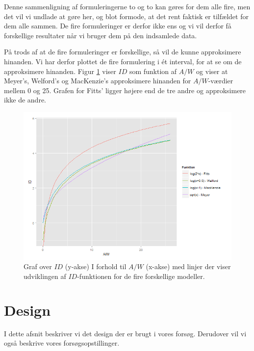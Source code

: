Denne sammenligning af formuleringerne to og to kan gøres for dem alle fire, men det vil vi undlade at gøre her, og blot formode, at det rent faktisk er tilfældet for dem alle sammen. De fire formuleringer er derfor ikke ens og vi vil derfor få forskellige resultater når vi bruger dem på den indsamlede data.

På trods af at de fire formuleringer er forskellige, så vil de kunne approksimere hinanden. Vi har derfor plottet de fire formulering i ét interval, for at se om de approksimere hinanden. Figur \ref{fig:Sammenligning} viser $ID$ som funktion af $A/W$ og viser at Meyer's, Welford's og MacKenzie's approksimere hinanden for $A/W$-værdier mellem 0 og 25. Grafen for Fitts' ligger højere end de tre andre og approksimere ikke de andre.

\begin{figure}[h]
\centering
\includegraphics[width=\linewidth]{images/plots/plot_comparison_id}
\caption{Graf over $ID$ (y-akse) I forhold til $A/W$ (x-akse) med linjer der viser udviklingen af $ID$-funktionen for de fire forskellige modeller.}
\label{fig:Sammenligning}
\end{figure}

\chapter*{Design}
I dette afsnit beskriver vi det design der er brugt i vores forsøg. Derudover vil vi også beskrive vores forsøgsopstillinger.

